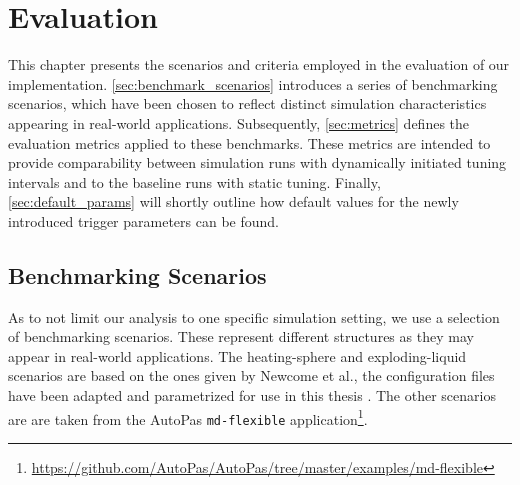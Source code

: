 \chapter[Evaluation]{Evaluation}
\label{cp:evaluation}

{
	\parindent0pt
	This chapter presents the scenarios and criteria employed in the evaluation of our implementation. \autoref{sec:benchmark_scenarios} introduces a series of benchmarking scenarios, which have been chosen to reflect distinct simulation characteristics appearing in real-world applications. Subsequently, \autoref{sec:metrics} defines the evaluation metrics applied to these benchmarks. These metrics are intended to provide comparability between simulation runs with dynamically initiated tuning intervals and to the baseline runs with static tuning.
	Finally, \autoref{sec:default_params} will shortly outline how default values for the newly introduced trigger parameters can be found.
}


\section{Benchmarking Scenarios}
\label{sec:benchmark_scenarios}
As to not limit our analysis to one specific simulation setting, we use a selection of benchmarking scenarios. These represent different structures as they may appear in real-world applications. %
The heating-sphere and exploding-liquid scenarios are based on the ones given by Newcome et al., the configuration files have been adapted and parametrized for use in this thesis \cite{Newcome2025}.
The other scenarios are are taken from the AutoPas \texttt{md-flexible} application\footnote{\href{https://github.com/AutoPas/AutoPas/tree/master/examples/md-flexible}{https://github.com/AutoPas/AutoPas/tree/master/examples/md-flexible}}.



\newcommand{\fastcolorbar}{%
	\centering
	\begin{tikzpicture}
		\pgfplotscolorbardrawstandalone[
			colorbar,
			colormap name=fast,
			point meta min=0,
			point meta max=50,
			colorbar style={
					height=3cm,
					ytick={0,10,...,50},
					tick align=outside,
					tick pos=right,
				},
		]
	\end{tikzpicture}

	\begin{tikzpicture}
		\node[anchor=north, align=center] at (0,0) {\si{F^{*}}};
	\end{tikzpicture}
}

